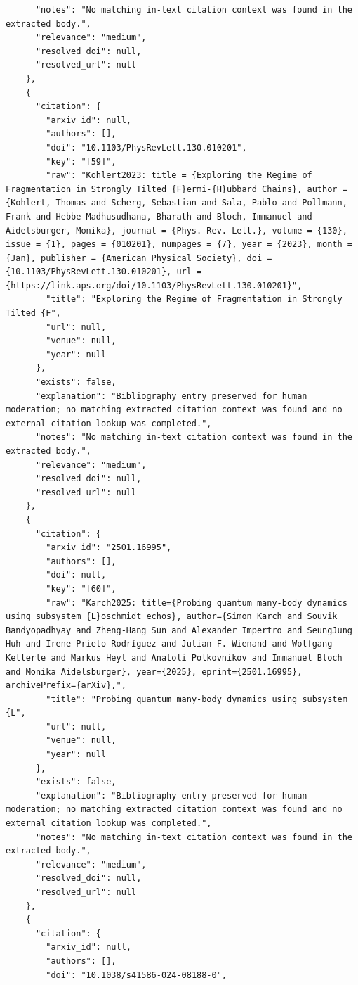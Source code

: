\documentclass[11pt]{article}
\begin{document}
\begin{verbatim}
      "notes": "No matching in-text citation context was found in the extracted body.",
      "relevance": "medium",
      "resolved_doi": null,
      "resolved_url": null
    },
    {
      "citation": {
        "arxiv_id": null,
        "authors": [],
        "doi": "10.1103/PhysRevLett.130.010201",
        "key": "[59]",
        "raw": "Kohlert2023: title = {Exploring the Regime of Fragmentation in Strongly Tilted {F}ermi-{H}ubbard Chains}, author = {Kohlert, Thomas and Scherg, Sebastian and Sala, Pablo and Pollmann, Frank and Hebbe Madhusudhana, Bharath and Bloch, Immanuel and Aidelsburger, Monika}, journal = {Phys. Rev. Lett.}, volume = {130}, issue = {1}, pages = {010201}, numpages = {7}, year = {2023}, month = {Jan}, publisher = {American Physical Society}, doi = {10.1103/PhysRevLett.130.010201}, url = {https://link.aps.org/doi/10.1103/PhysRevLett.130.010201}",
        "title": "Exploring the Regime of Fragmentation in Strongly Tilted {F",
        "url": null,
        "venue": null,
        "year": null
      },
      "exists": false,
      "explanation": "Bibliography entry preserved for human moderation; no matching extracted citation context was found and no external citation lookup was completed.",
      "notes": "No matching in-text citation context was found in the extracted body.",
      "relevance": "medium",
      "resolved_doi": null,
      "resolved_url": null
    },
    {
      "citation": {
        "arxiv_id": "2501.16995",
        "authors": [],
        "doi": null,
        "key": "[60]",
        "raw": "Karch2025: title={Probing quantum many-body dynamics using subsystem {L}oschmidt echos}, author={Simon Karch and Souvik Bandyopadhyay and Zheng-Hang Sun and Alexander Impertro and SeungJung Huh and Irene Prieto Rodríguez and Julian F. Wienand and Wolfgang Ketterle and Markus Heyl and Anatoli Polkovnikov and Immanuel Bloch and Monika Aidelsburger}, year={2025}, eprint={2501.16995}, archivePrefix={arXiv},",
        "title": "Probing quantum many-body dynamics using subsystem {L",
        "url": null,
        "venue": null,
        "year": null
      },
      "exists": false,
      "explanation": "Bibliography entry preserved for human moderation; no matching extracted citation context was found and no external citation lookup was completed.",
      "notes": "No matching in-text citation context was found in the extracted body.",
      "relevance": "medium",
      "resolved_doi": null,
      "resolved_url": null
    },
    {
      "citation": {
        "arxiv_id": null,
        "authors": [],
        "doi": "10.1038/s41586-024-08188-0",

\end{verbatim}
\end{document}

